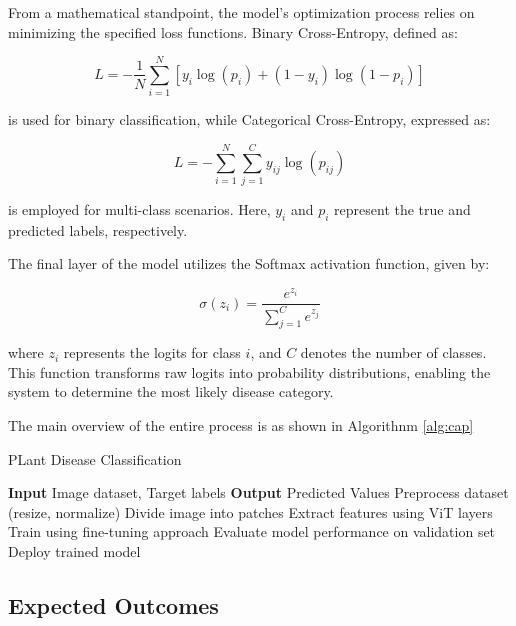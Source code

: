  

From a mathematical standpoint, the model’s optimization process relies on minimizing the specified loss functions. Binary Cross-Entropy, defined as:  

\[
L = -\frac{1}{N} \sum_{i=1}^{N} \left[ y_i \log(p_i) + (1 - y_i) \log(1 - p_i) \right]
\]  

is used for binary classification, while Categorical Cross-Entropy, expressed as:  

\[
L = -\sum_{i=1}^{N} \sum_{j=1}^{C} y_{ij} \log(p_{ij})
\]  

is employed for multi-class scenarios. Here, \( y_i \) and \( p_i \) represent the true and predicted labels, respectively.  

The final layer of the model utilizes the Softmax activation function, given by:  

\[
\sigma(z_i) = \frac{e^{z_i}}{\sum_{j=1}^{C} e^{z_j}}
\]  

where \( z_i \) represents the logits for class \( i \), and \( C \) denotes the number of classes. This function transforms raw logits into probability distributions, enabling the system to determine the most likely disease category.  

The main overview of the entire process is as shown in Algorithnm \ref{alg:cap}

\begin{algorithm}[h]
\caption{PLant Disease Classification }\label{alg:cap}
\begin{algorithmic}[1]
\State \textbf{Input} Image dataset, Target labels\;
\State \textbf{Output} Predicted Values\;
\State Preprocess dataset (resize, normalize)\;
\State Divide image into patches\;
\State Extract features using ViT layers\;
\State Train using fine-tuning approach\;
\State Evaluate model performance on validation set\;
\State Deploy trained model\;

\end{algorithmic} 

\end{algorithm}


\subsection{ Expected Outcomes}

